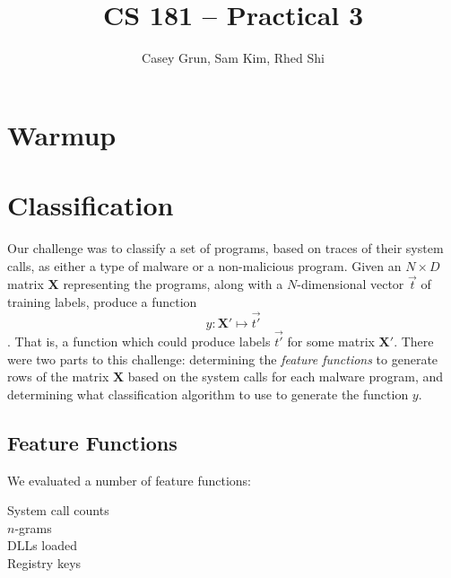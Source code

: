\documentclass[11pt]{amsart}
\title{CS 181 -- Practical 3}
\author{Casey Grun, Sam Kim, Rhed Shi}
\newcommand{\mat}[1]{\mathbf{#1}}
\begin{document}
\maketitle

\section{Warmup}


\section{Classification}

Our challenge was to classify a set of programs, based on traces of their system calls, as either a type of malware or a non-malicious program. Given an $N \times D$ matrix $\mat{X}$ representing the programs, along with a $N$-dimensional vector $\vec{t}$ of training labels, produce a function 
$$y : \mat{X'} \mapsto \vec{t'}$$.
That is, a function which could produce labels $\vec{t'}$ for some matrix $\mat{X'}$. There were two parts to this challenge: determining the \emph{feature functions} to generate rows of the matrix $\mat{X}$ based on the system calls for each malware program, and determining what classification algorithm to use to generate the function $y$.

\subsection{Feature Functions}

We evaluated a number of feature functions:
\begin{description}
  \item[System call counts]
  \item[$n$-grams]
  \item[DLLs loaded]
  \item[Registry keys]
\end{description}
\end{document}
